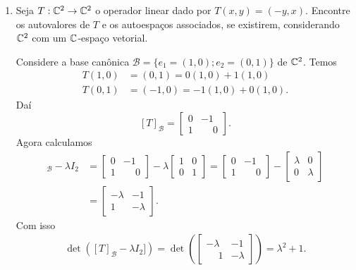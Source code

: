 \begin{exemplo}
\begin{enumerate}[label={\arabic*})]
        \item Seja $T : \mathbb{C}^2 \to \mathbb{C}^2$ o operador linear dado por $T(x,y) = (-y,x)$. Encontre os autovalores de $T$ e os
            autoespaços associados, se existirem, considerando $\mathbb{C}^2$ com um $\mathbb{C}$-espaço vetorial.
        \begin{solucao}
            Considere a base canônica $\mathcal{B} = \{e_1 = (1, 0); e_2 = (0, 1)\}$ de $\mathbb{C}^2$. Temos
            \begin{align}
                T(1,0) &= (0,1) = 0(1,0) + 1(1,0)\\
                T(0,1) &= (-1,0) = -1(1,0) + 0(1,0).
            \end{align}
            Daí
            \[
                [T]_\mathcal{B} = \begin{bmatrix}0 & -1\\ 1 & \phantom{-}0\end{bmatrix}.
            \]
            Agora calculamos
            \begin{align*}
                [T]_\mathcal{B} - \lambda I_2 &= \begin{bmatrix}0 & -1\\ 1 & \phantom{-}0\end{bmatrix} -
                \lambda\begin{bmatrix}1 & 0\\0 & 1\end{bmatrix} = \begin{bmatrix}0 & -1\\ 1 & \phantom{-}0\end{bmatrix} -
                \begin{bmatrix}\lambda & 0\\0 & \lambda\end{bmatrix}\\ &= \begin{bmatrix}-\lambda & -1\\ 1 & -\lambda\end{bmatrix}.
            \end{align*}
            Com isso
            \begin{align*}
                \det([T]_\mathcal{B} - \lambda I_2]) = \det\left(\begin{bmatrix} -\lambda & -1\\\phantom{-}1 & -\lambda\end{bmatrix}
                \right) = \lambda^2 + 1.
            \end{align*}


\end{solucao}
\end{enumerate}
\end{exemplo}
